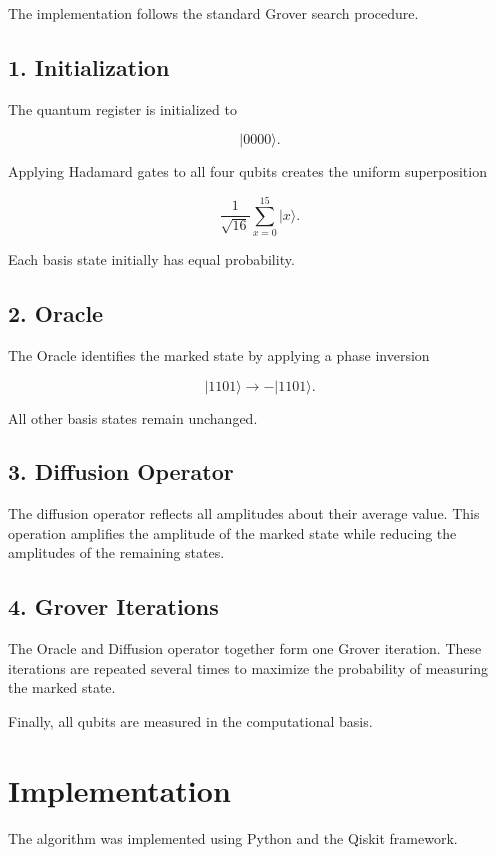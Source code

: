 \documentclass[12pt,a4paper]{article}
\begin{document}
The implementation follows the standard Grover search procedure.

\subsection*{1. Initialization}

The quantum register is initialized to

\[
|0000\rangle.
\]

Applying Hadamard gates to all four qubits creates the uniform superposition

\[
\frac{1}{\sqrt{16}}
\sum_{x=0}^{15}|x\rangle.
\]

Each basis state initially has equal probability.

\subsection*{2. Oracle}

The Oracle identifies the marked state by applying a phase inversion

\[
|1101\rangle
\rightarrow
-
|1101\rangle.
\]

All other basis states remain unchanged.

\subsection*{3. Diffusion Operator}

The diffusion operator reflects all amplitudes about their average value. This operation amplifies the amplitude of the marked state while reducing the amplitudes of the remaining states.

\subsection*{4. Grover Iterations}

The Oracle and Diffusion operator together form one Grover iteration. These iterations are repeated several times to maximize the probability of measuring the marked state.

Finally, all qubits are measured in the computational basis.

\section{Implementation}

The algorithm was implemented using Python and the Qiskit framework.
\end{document}
